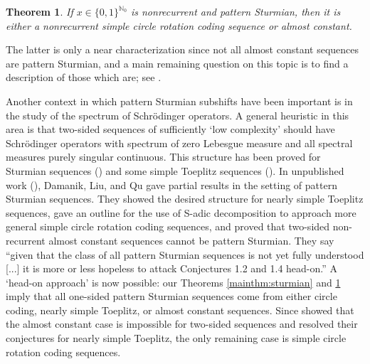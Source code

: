 \documentclass[11pt,reqno]{amsart}
\theoremstyle{definition}
\theoremstyle{plain}
\newcounter{MainTheoremCounter}
\newtheorem{Maintheorem}[MainTheoremCounter]{Theorem}
\newcommand{\N}{\mathbb{N}}
\newcommand{\AuthornoteA}[2]{{\sf\small\color{magenta}{[#1: #2]}}}
\newcommand{\AuthornoteR}[2]{{\sf\small\color{blue}{[#1: #2]}}}
\newcommand{\Anote}{\AuthornoteA{A}}
\newcommand{\rp}{\AuthornoteR{R}}
\begin{document}





\begin{Maintheorem}\label{mainthm:sturmian-nonrecurrent}
If $x \in \{0,1\}^{\N_0}$ is nonrecurrent and pattern Sturmian, then it is either a nonrecurrent simple circle rotation coding sequence or almost constant.
\end{Maintheorem}

The latter is only a near characterization since not all almost constant sequences are pattern Sturmian, and a main remaining question on this topic is to find a description of those which are; see .

Another context in which pattern Sturmian subshifts have been important is in the study of the spectrum of Schr\"{o}dinger operators. A general heuristic in this area is that two-sided sequences of sufficiently `low complexity' should have Schr\"{o}dinger operators with spectrum of zero Lebesgue measure and all spectral measures purely singular continuous. This structure has been proved for Sturmian sequences (\cite{schrod1, schrod2}) and some simple Toeplitz sequences (\cite{schrod3}). In unpublished work (\cite{Damanik_Liu_Qu-spectralProperties}), Damanik, Liu, and Qu gave partial results in the setting of pattern Sturmian sequences. They showed the desired structure for nearly simple Toeplitz sequences, gave an outline for the use of S-adic decomposition to approach more general simple circle rotation coding sequences, and proved that two-sided non-recurrent almost constant sequences cannot be pattern Sturmian. They say ``given that the class of all pattern Sturmian sequences is not yet fully understood [...] it is more or less hopeless to attack Conjectures 1.2 and 1.4 head-on.'' A `head-on approach' is now possible: our Theorems \ref{mainthm:sturmian} and \ref{mainthm:sturmian-nonrecurrent} imply that all one-sided pattern Sturmian sequences come from either circle coding, nearly simple Toeplitz, or almost constant sequences. Since \cite{Damanik_Liu_Qu-spectralProperties} showed that the almost constant case is impossible for two-sided sequences and resolved their conjectures for nearly simple Toeplitz, the only remaining case is simple circle rotation coding sequences.
\end{document}
